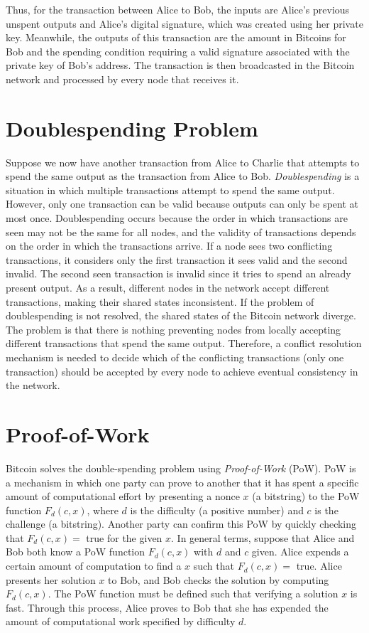\documentclass{article}
\begin{document}
Thus, for the transaction between Alice to Bob, the inputs are Alice's previous
unspent outputs and Alice's digital signature, which was created using her
private key. Meanwhile, the outputs of this transaction are the amount in
Bitcoins for Bob and the spending condition requiring a valid signature
associated with the private key of Bob's address. The transaction is then
broadcasted in the Bitcoin network and processed by every node that receives it.

\section{Doublespending Problem}

Suppose we now have another transaction from Alice to Charlie that attempts to
spend the same output as the transaction from Alice to Bob.
\emph{Doublespending} is a situation in which multiple transactions attempt to
spend the same output. However, only one transaction can be valid because
outputs can only be spent at most once. Doublespending occurs because the order
in which transactions are seen may not be the same for all nodes, and the
validity of transactions depends on the order in which the transactions arrive.
If a node sees two conflicting transactions, it considers only the first
transaction it sees valid and the second invalid. The second seen transaction is
invalid since it tries to spend an already present output. As a result,
different nodes in the network accept different transactions, making their
shared states inconsistent. If the problem of doublespending is not resolved,
the shared states of the Bitcoin network diverge. The problem is that there is
nothing preventing nodes from locally accepting different transactions that
spend the same output. Therefore, a conflict resolution mechanism is needed to
decide which of the conflicting transactions (only one transaction) should be
accepted by every node to achieve eventual consistency in the network.

\section{Proof-of-Work}
Bitcoin solves the double-spending problem using \emph{Proof-of-Work} (PoW). PoW is a mechanism in which one party can prove to another that it has spent a specific amount of computational effort by presenting a nonce $x$ (a bitstring) to the PoW function $F_d(c,x)$, where $d$ is the difficulty (a positive number) and $c$ is the challenge (a bitstring). Another party can confirm this PoW by quickly checking that $F_d(c,x) =$ true for the given $x$. 
In general terms, suppose that Alice and Bob both know a PoW function $F_d(c,x)$ with $d$ and $c$ given. Alice expends a certain amount of computation to find a $x$ such that $F_d(c,x) =$ true. Alice presents her solution $x$ to Bob, and Bob checks the solution by computing $F_d(c,x)$. The PoW function must be defined such that verifying a solution $x$ is fast. Through this process, Alice proves to Bob that she has expended the amount of computational work specified by difficulty $d$.
\end{document}
